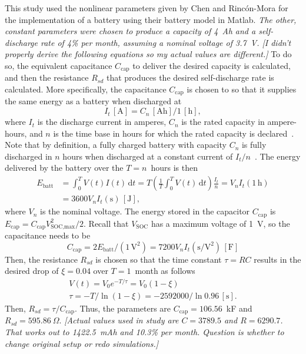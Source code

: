 \documentclass[../zhang_thesis.tex]{subfiles}
\begin{document}
This study used the nonlinear parameters given by Chen and Rinc\'on-Mora for the implementation of a battery using their battery model in Matlab. \emph{The other, constant parameters were chosen to produce a capacity of 4~Ah and a self-discharge rate of 4\% per month, assuming a nominal voltage of 3.7~V. [I didn't properly derive the following equations so my actual values are different.]} To do so, the equivalent capacitance $C_\text{cap}$ to deliver the desired capacity is calculated, and then the resistance $R_{sd}$
that produces the desired self-discharge rate is calculated. More specifically, the capacitance $C_\text{cap}$ is chosen to so that it supplies the same energy as a battery when discharged at
\begin{equation}
    I_t\,[\text{A}] = C_n\,[\text{Ah}] / 1\,[\text{h}],
\end{equation}
where $I_t$ is the discharge current in amperes, $C_n$ is the rated capacity in ampere-hours, and $n$ is the time base in hours for which the rated capacity is declared~\cite{iec61434,linden01_ch3}. Note that by definition, a fully charged battery with capacity $C_n$ is fully discharged in $n$ hours when discharged at a constant current of $I_t/n$~\cite{linden01_ch3}. The energy delivered by the battery over the $T=n$~hours is then
\begin{align}
    E_\text{batt} &= \int_0^T V(t) I(t) \,\mathrm{d}t = T \left( \frac{1}{T} \int_0^T V(t)\,\mathrm{d}t \right) \frac{I_t}{n} = V_n I_t (1\,\text{h}) \\
    &= 3600 V_n I_t (\text{s}) \,[\text{J}],
\end{align}
where $V_n$ is the nominal voltage. The energy stored in the capacitor $C_\text{cap}$ is $E_\text{cap} = C_\text{cap} V_\text{SOC,max}^2 / 2$. Recall that $V_\text{SOC}$ has a maximum voltage of 1~V, so the capacitance needs to be
\begin{equation}
    C_\text{cap} = 2E_\text{batt}/(1\,\text{V}^2) = 7200 V_n I_t (\text{s}/\text{V}^2) \,[\text{F}]
\end{equation}
Then, the resistance $R_{sd}$ is chosen so that the time constant $\tau=RC$ results in the desired drop of $\xi=0.04$ over $T=1$~month as follows
\begin{gather}
    V(t) = V_0 e^{-T/\tau} = V_0 (1-\xi) \\
    \tau = -T/\ln(1-\xi) = -2592000/\ln 0.96 \,[\text{s}].
\end{gather}
Then, $R_{sd}=\tau/C_\text{cap}$. Thus, the parameters are $C_\text{cap}=106.56$~kF and $R_{sd}=595.86~\Omega$. \emph{[Actual values used in study are $C=3789.5$ and $R=6290.7$. That works out to 1422.5~mAh and 10.3\% per month. Question is whether to change original setup or redo simulations.]}
\end{document}
